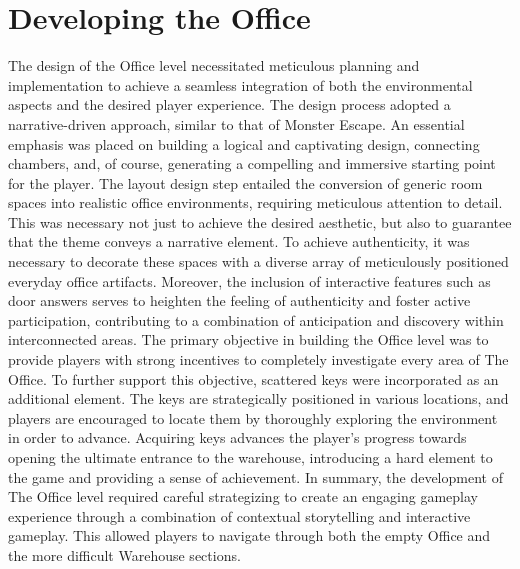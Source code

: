 \documentclass{vgtc}                          %
\begin{document}
\section{Developing the Office}
The design of the Office level necessitated meticulous planning and implementation to achieve a seamless integration of both the environmental aspects and the desired player experience. The design process adopted a narrative-driven approach, similar to that of Monster Escape. An essential emphasis was placed on building a logical and captivating design, connecting chambers, and, of course, generating a compelling and immersive starting point for the player. The layout design step entailed the conversion of generic room spaces into realistic office environments, requiring meticulous attention to detail. This was necessary not just to achieve the desired aesthetic, but also to guarantee that the theme conveys a narrative element. To achieve authenticity, it was necessary to decorate these spaces with a diverse array of meticulously positioned everyday office artifacts. Moreover, the inclusion of interactive features such as door answers serves to heighten the feeling of authenticity and foster active participation, contributing to a combination of anticipation and discovery within interconnected areas. The primary objective in building the Office level was to provide players with strong incentives to completely investigate every area of The Office. To further support this objective, scattered keys were incorporated as an additional element. The keys are strategically positioned in various locations, and players are encouraged to locate them by thoroughly exploring the environment in order to advance. Acquiring keys advances the player's progress towards opening the ultimate entrance to the warehouse, introducing a hard element to the game and providing a sense of achievement. In summary, the development of The Office level required careful strategizing to create an engaging gameplay experience through a combination of contextual storytelling and interactive gameplay. This allowed players to navigate through both the empty Office and the more difficult Warehouse sections. 
\end{document}
